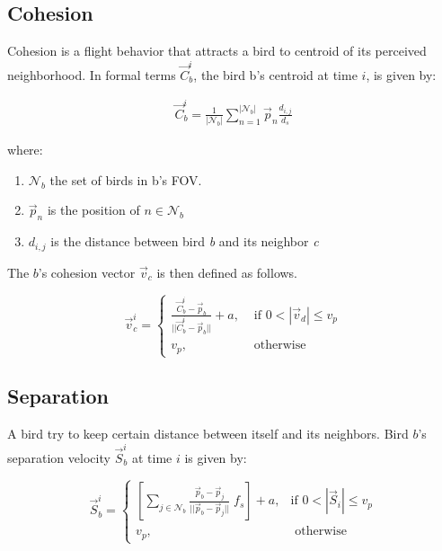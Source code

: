 \subsection{Cohesion}
Cohesion is a flight behavior that attracts a bird to centroid of  its perceived
neighborhood. 
In formal terms \(\vec{C}_b^i\), the bird b's centroid at time $i$, is given by:

\begin{align}
 \vec{C}_b^i = \frac{1}{|\mathcal{N}_b|}\sum_{n=1}^{|\mathcal{N}_b|}{\vec{p}_n  \frac{d_{i,j}}{d_s}}
\end{align}

where:

\begin{enumerate}
\item \(\mathcal{N}_b\) the set of birds in b's FOV.
\item \(\vec{p}_n\) is the position of $n \in \mathcal{N}_b$
\item \(d_{i,j}\) is the distance between bird \emph{b} and its neighbor
	\emph{c}

\end{enumerate}

The $b$'s cohesion vector \(\vec{v}_c\) is then defined as follows.

\begin{equation}
\vec{v}_c^i =
	\begin{cases}
	 \frac{\vec{C}_b^i - \vec{p}_b}{|| \vec{C}_b^i - \vec{p}_b ||} +
		a, &\mbox{ if } 0 < |\vec{v}_d| \leq v_p \\
		v_p, &\mbox{ otherwise } 
	\end{cases}
\end{equation}

\subsection{Separation}
\label{sect:separation}
A bird try to keep certain distance between itself and
its neighbors. Bird $b$'s separation velocity $\vec{S}_b^i$ at time $i$ is given
by:


\begin{equation}
\vec{S}_b^i = 
	\begin{cases}
	 \left[\sum_{j \in \mathcal{N}_b}{\frac{\vec{p}_b -
\vec{p}_j}{||\vec{p}_b - \vec{p}_j||}} \;f_s\right] + a ,&\mbox{if } 0 < |\vec{S}_i|
\leq v_p\\
		v_p, &\mbox{ otherwise } 
	\end{cases}
\end{equation}



